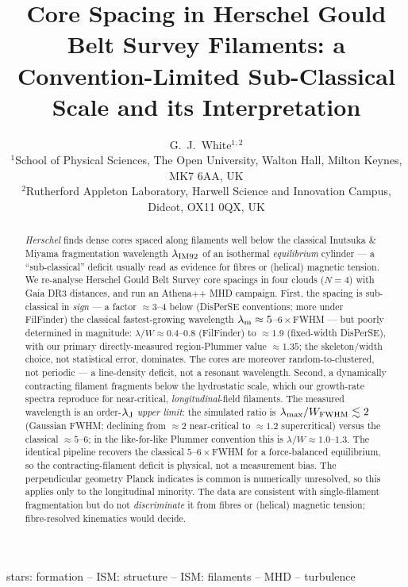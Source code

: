 \documentclass[usenatbib,twoside,twocolumn]{mnras}
\title{Core Spacing in Herschel Gould Belt Survey Filaments: a Convention-Limited Sub-Classical Scale and its Interpretation}
\author[G.~J.~White]{G.~J.~White$^{1,2}$\\
$^{1}$School of Physical Sciences, The Open University, Walton Hall, Milton Keynes, MK7 6AA, UK\\
$^{2}$Rutherford Appleton Laboratory, Harwell Science and Innovation Campus, Didcot, OX11 0QX, UK}
\begin{document}
\maketitle

\begin{abstract}
\textit{Herschel} finds dense cores spaced along filaments well below the classical Inutsuka \& Miyama fragmentation wavelength $\lambda_{\rm IM92}$ of an isothermal \emph{equilibrium} cylinder --- a ``sub-classical'' deficit usually read as evidence for fibres or (helical) magnetic tension. We re-analyse Herschel Gould Belt Survey core spacings in four clouds ($N=4$) with Gaia DR3 distances, and run an Athena++ MHD campaign. First, the spacing is sub-classical in \emph{sign} --- a factor $\approx3$--$4$ below (DisPerSE conventions; more under FilFinder) the classical fastest-growing wavelength $\lambda_{\rm m}\approx5$--$6\times$FWHM --- but poorly determined in magnitude: $\lambda/W\approx0.4$--$0.8$ (FilFinder) to $\approx1.9$ (fixed-width DisPerSE), with our primary directly-measured region-Plummer value $\approx1.35$; the skeleton/width choice, not statistical error, dominates. The cores are moreover random-to-clustered, not periodic --- a line-density deficit, not a resonant wavelength. Second, a dynamically contracting filament fragments below the hydrostatic scale, which our growth-rate spectra reproduce for near-critical, \emph{longitudinal}-field filaments. The measured wavelength is an order-$\lambda_{\rm J}$ \emph{upper limit}: the simulated ratio is $\lambda_{\rm max}/W_{\rm FWHM}\lesssim2$ (Gaussian FWHM; declining from $\approx2$ near-critical to $\approx1.2$ supercritical) versus the classical $\approx5$--$6$; in the like-for-like Plummer convention this is $\lambda/W\approx1.0$--$1.3$. The identical pipeline recovers the classical $5$--$6\times$FWHM for a force-balanced equilibrium, so the contracting-filament deficit is physical, not a measurement bias. The perpendicular geometry Planck indicates is common is numerically unresolved, so this applies only to the longitudinal minority. The data are consistent with single-filament fragmentation but do not \emph{discriminate} it from fibres or (helical) magnetic tension; fibre-resolved kinematics would decide.
\end{abstract}


\begin{keywords}
stars: formation -- ISM: structure -- ISM: filaments -- MHD -- turbulence
\end{keywords}
\end{document}
